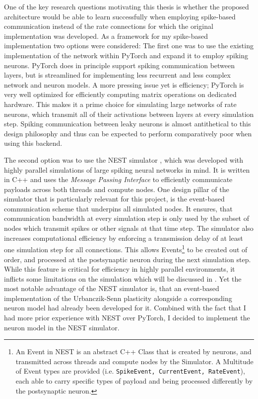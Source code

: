 One of the key research questions motivating this thesis is whether the proposed architecture would be able to learn
successfully when employing spike-based communication instead of the rate connections for which the original
implementation was developed. As a framework for my spike-based implementation two options were considered: The first
one was to use the existing implementation of the network within PyTorch  and expand it to
employ spiking neurons. PyTorch does in principle support spiking communication between layers, but is streamlined for
implementing less recurrent and less complex network and neuron models. A more pressing issue yet is efficiency; PyTorch
is very well optimized for efficiently computing matrix operations on dedicated hardware. This makes it a prime choice
for simulating large networks of rate neurons, which transmit all of their activations between layers at every
simulation step. Spiking communication between leaky neurons is almost antithetical to this design philosophy and thus
can be expected to perform comparatively poor when using this backend.

The second option was to use the NEST simulator \citeme, which was developed with highly parallel simulations of large
spiking neural networks in mind. It is written in C++ and uses the \textit{Message Passing Interface} to efficiently
communicate payloads across both threads and compute nodes. One design pillar of the simulator that is particularly
relevant for this project, is the event-based communication scheme that underpins all simulated nodes. It ensures, that
communication bandwidth at every simulation step is only used by the subset of nodes which transmit spikes or other
signals at that time step. The simulator also increases computational efficiency by enforcing a transmission delay of at
least one simulation step for all connections. This allows Events\footnote{An Event in NEST is an abstract C++ Class
that is created by neurons, and transmitted across threads and compute nodes by the Simulator. A Multitude of Event
types are provided (i.e. \texttt{SpikeEvent, CurrentEvent, RateEvent}), each able to carry specific types of payload and
being processed differently by the postsynaptic neuron.} to be created out of order, and processed at the postsynaptic
neuron during the next simulation step. While this feature is critical for efficiency in highly parallel environments,
it inflicts some limitations on the simulation which will be discussed in . Yet the most notable
advantage of the NEST simulator is, that an event-based implementation of the Urbanczik-Senn plasticity alongside a
corresponding neuron model had already been developed for it. Combined with the fact that I had more prior experience
with NEST over PyTorch, I decided to implement the neuron model in the NEST simulator.


